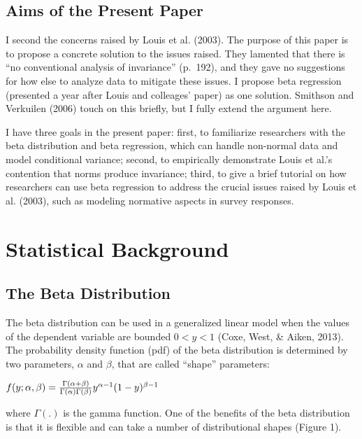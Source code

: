 \documentclass[english,,man]{apa6}
\begin{document}
\hypertarget{aims-of-the-present-paper}{%
\subsection{Aims of the Present Paper}\label{aims-of-the-present-paper}}

I second the concerns raised by Louis et al. (2003). The purpose of this paper is to propose a concrete solution to the issues raised. They lamented that there is \enquote{no conventional analysis of invariance} (p.~192), and they gave no suggestions for how else to analyze data to mitigate these issues. I propose beta regression (presented a year after Louis and colleages' paper) as one solution. Smithson and Verkuilen (2006) touch on this briefly, but I fully extend the argument here.

I have three goals in the present paper: first, to familiarize researchers with the beta distribution and beta regression, which can handle non-normal data and model conditional variance; second, to empirically demonstrate Louis et al.'s contention that norms produce invariance; third, to give a brief tutorial on how researchers can use beta regression to address the crucial issues raised by Louis et al. (2003), such as modeling normative aspects in survey responses.

\hypertarget{statistical-background}{%
\section{Statistical Background}\label{statistical-background}}

\hypertarget{the-beta-distribution}{%
\subsection{The Beta Distribution}\label{the-beta-distribution}}

The beta distribution can be used in a generalized linear model when the values of the dependent variable are bounded \(0 < y < 1\) (Coxe, West, \& Aiken, 2013). The probability density function (pdf) of the beta distribution is determined by two parameters, \(\alpha\) and \(\beta\), that are called \enquote{shape} parameters:

\begin{center}
$f(y;\alpha,\beta)={\Gamma(\alpha+\beta)\over\Gamma(\alpha)\Gamma(\beta)}y^{\alpha-1}(1-y)^{\beta-1}$
\end{center}

where \(\Gamma(.)\) is the gamma function. One of the benefits of the beta distribution is that it is flexible and can take a number of distributional shapes (Figure 1).
\end{document}
